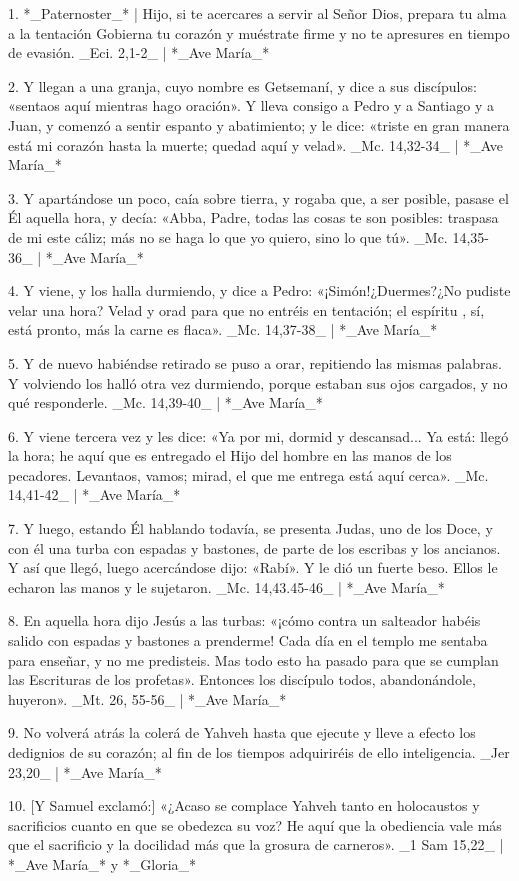 1. *_Paternoster_* | Hijo, si te acercares a servir al Señor Dios, prepara tu alma a la tentación Gobierna tu corazón y muéstrate firme y no te apresures en tiempo de evasión. _Eci. 2,1-2_ | *_Ave María_*

2. Y llegan a una granja, cuyo nombre es Getsemaní, y dice a sus discípulos: «sentaos aquí mientras hago oración». Y lleva consigo a Pedro y a Santiago y a Juan, y comenzó a sentir espanto y abatimiento; y le dice: «triste en gran manera está mi corazón hasta la muerte; quedad aquí y velad». _Mc. 14,32-34_ | *_Ave María_*

3. Y apartándose un poco, caía sobre tierra, y rogaba que, a ser posible, pasase el Él aquella hora, y decía: «Abba, Padre, todas las cosas te son posibles: traspasa de mi este cáliz; más no se haga lo que yo quiero, sino lo que tú». _Mc. 14,35-36_ | *_Ave María_*

4. Y viene, y los halla durmiendo, y dice a Pedro: «¡Simón!¿Duermes?¿No pudiste velar una hora? Velad y orad para que no entréis en tentación; el espíritu , sí, está pronto, más la carne es flaca». _Mc. 14,37-38_ | *_Ave María_*

5. Y de nuevo habiéndse retirado se puso a orar, repitiendo las mismas palabras. Y volviendo los halló otra vez durmiendo, porque estaban sus ojos cargados, y no qué responderle. _Mc. 14,39-40_ | *_Ave María_*

6. Y viene tercera vez y les dice: «Ya por mi, dormid y descansad... Ya está: llegó la hora; he aquí que es entregado el Hijo del hombre en las manos de los pecadores. Levantaos, vamos; mirad, el que me entrega está aquí cerca». _Mc. 14,41-42_ | *_Ave María_*

7. Y luego, estando Él hablando todavía, se presenta Judas, uno de los Doce, y con él una turba con espadas y bastones, de parte de los escribas y los ancianos. Y así que llegó, luego acercándose dijo: «Rabí». Y le dió un fuerte beso. Ellos le echaron las manos y le sujetaron. _Mc. 14,43.45-46_ | *_Ave María_* 

8. En aquella hora dijo Jesús a las turbas: «¡cómo contra un salteador habéis salido con espadas y bastones a prenderme! Cada día en el templo me sentaba para enseñar, y no me predisteis. Mas todo esto ha pasado para que se cumplan las Escrituras de los profetas». Entonces los discípulo todos, abandonándole, huyeron». _Mt. 26, 55-56_ | *_Ave María_*

9. No volverá atrás la colerá de Yahveh hasta que ejecute y lleve a efecto los dedignios de su corazón; al fin de los tiempos adquiriréis de ello inteligencia. _Jer 23,20_ | *_Ave María_*

10. [Y Samuel exclamó:] «¿Acaso se complace Yahveh tanto en holocaustos y sacrificios cuanto en que se obedezca su voz? He aquí que la obediencia vale más que el sacrificio y la docilidad más que la grosura de carneros». _1 Sam 15,22_ | *_Ave María_* y *_Gloria_*